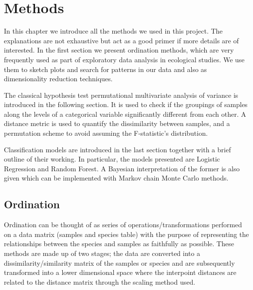 
\chapter{Methods}

\ifpdf
    \graphicspath{{Chapter2/Figs/Raster/}{Chapter2/Figs/PDF/}{Chapter2/Figs/}}
\else
    \graphicspath{{Chapter2/Figs/Vector/}{Chapter2/Figs/}}
\fi
In this chapter we introduce all the methods we used in this project. The explanations are not exhaustive but act as a good primer if more details are of interested.
In the first section we present ordination methods, which are very frequently used as part of exploratory data analysis in ecological studies. We use them to sketch plots and search for patterns in our data and also as dimensionality reduction techniques.

The classical hypothesis test permutational multivariate analysis of variance is introduced in the following section. It is used to check if the groupings of samples along the levels of a categorical variable significantly different from each other. A distance metric is used to quantify the dissimilarity between samples, and a permutation scheme to avoid assuming the F-statistic's distribution. 

Classification models are introduced in the last section together with a brief outline of their working. In particular, the models presented are Logistic Regression and Random Forest. A Bayesian interpretation of the former is also given which can be implemented with Markov chain Monte Carlo methods.  

\section{Ordination}
\label{sec:ordination}
Ordination can be thought of as series of operations/transformations performed on a data matrix (samples and species table) with the purpose of representing the relationships between the species and samples as faithfully as possible. These methods are made up of two stages; the data are converted into a dissimilarity/similarity matrix of the samples or species and are subsequently transformed into a lower dimensional space where the interpoint distances are related to the distance matrix through the scaling method used.

